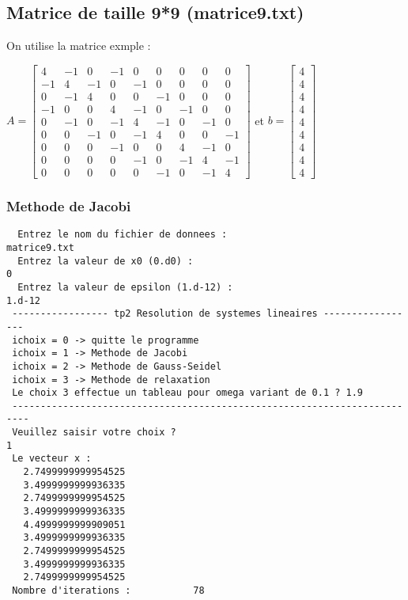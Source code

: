 \documentclass{report}
\begin{document}
\newpage
\subsection{Matrice de taille 9*9 (matrice9.txt)}
On utilise la matrice exmple :


$A=\left[\begin{array}{rrrrrrrrr}
 4 & -1 &  0 & -1 &  0 &  0 &  0 &  0 &  0 \\
-1 &  4 & -1 &  0 & -1 &  0 &  0 &  0 &  0 \\
 0 & -1 &  4 &  0 &  0 & -1 &  0 &  0 &  0 \\
-1 &  0 &  0 &  4 & -1 &  0 & -1 &  0 &  0 \\
 0 & -1 &  0 & -1 &  4 & -1 &  0 & -1 &  0 \\
 0 &  0 & -1 &  0 & -1 &  4 &  0 &  0 & -1 \\
 0 &  0 &  0 & -1 &  0 &  0 &  4 & -1 &  0 \\
 0 &  0 &  0 &  0 & -1 &  0 & -1 &  4 & -1 \\
 0 &  0 &  0 &  0 &  0 & -1 &  0 & -1 &  4
\end{array}\right]$
et $b=\left[\begin{array}{rrrrrrrrr}
4 \\
4 \\
4 \\
4 \\
4 \\
4 \\
4 \\
4 \\
4
\end{array}\right]$

\subsubsection{Methode de Jacobi}
\begin{small}
\begin{verbatim}
  Entrez le nom du fichier de donnees : 
matrice9.txt
  Entrez la valeur de x0 (0.d0) :
0
  Entrez la valeur de epsilon (1.d-12) :
1.d-12
 ----------------- tp2 Resolution de systemes lineaires -----------------
 ichoix = 0 -> quitte le programme
 ichoix = 1 -> Methode de Jacobi
 ichoix = 2 -> Methode de Gauss-Seidel
 ichoix = 3 -> Methode de relaxation
 Le choix 3 effectue un tableau pour omega variant de 0.1 ? 1.9
 -------------------------------------------------------------------------
 Veuillez saisir votre choix ?
1
 Le vecteur x :
   2.7499999999954525     
   3.4999999999936335     
   2.7499999999954525     
   3.4999999999936335     
   4.4999999999909051     
   3.4999999999936335     
   2.7499999999954525     
   3.4999999999936335     
   2.7499999999954525     
 Nombre d'iterations :           78
\end{verbatim}
\end{small}
\end{document}
